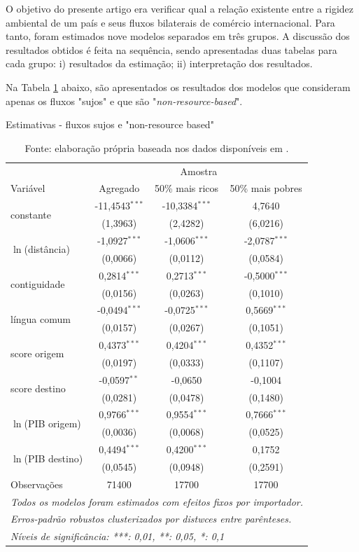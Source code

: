 \documentclass[12pt,
               openright,
               oneside,
               a4paper,
							 section=TITLE,     %
               subsection=Title,  %
               english,brazil]{article}
\begin{document}
O objetivo do presente artigo era verificar qual a relação existente entre a rigidez ambiental de um país e seus fluxos bilaterais de comércio internacional. Para tanto, foram estimados nove modelos separados em três grupos. A discussão dos resultados obtidos é feita na sequência, sendo apresentadas duas tabelas para cada grupo: i) resultados da estimação; ii) interpretação dos resultados. 

Na Tabela \ref{tab:resultados_nrb} abaixo, são apresentados os resultados dos modelos que consideram apenas os fluxos "sujos"  e que são "\textit{non-resource-based}".
\begin{table}[H]
\centering
\caption{Estimativas - fluxos sujos e "non-resource based"}
\label{tab:resultados_nrb}
\begin{tabular}{lccc}
 & \multicolumn{3}{c}{Amostra} \\ \cmidrule(l){2-4} 
Variável & Agregado & 50\% mais ricos & 50\% mais pobres \\ \midrule
\multirow{2}{*}{constante} & -11,4543$^{***}$ & -10,3384$^{***}$ & 4,7640 \\
 & (1,3963) & (2,4282) & (6,0216) \\
\multirow{2}{*}{$\ln$(distância)} & -1,0927$^{***}$ & -1,0606$^{***}$ & -2,0787$^{***}$ \\
 & (0,0066) & (0,0112) & (0,0584) \\
\multirow{2}{*}{contiguidade} & 0,2814$^{***}$ & 0,2713$^{***}$ & -0,5000$^{***}$ \\
 & (0,0156) & (0,0263) & (0,1010) \\
\multirow{2}{*}{língua comum} & -0,0494$^{***}$ & -0,0725$^{***}$ & 0,5669$^{***}$ \\
 & (0,0157) & (0,0267) & (0,1051) \\
\multirow{2}{*}{score origem} & 0,4373$^{***}$ & 0,4204$^{***}$ & 0,4352$^{***}$ \\
 & (0,0197) & (0,0333) & (0,1107) \\
\multirow{2}{*}{score destino} & -0,0597$^{**}$ & -0,0650 & -0,1004 \\
 & (0,0281) & (0,0478) & (0,1480) \\
\multirow{2}{*}{$\ln$(PIB origem)} & 0,9766$^{***}$ & 0,9554$^{***}$ & 0,7666$^{***}$ \\
 & (0,0036) & (0,0068) & (0,0525) \\
\multirow{2}{*}{$\ln$(PIB destino)} & 0,4494$^{***}$ & 0,4200$^{***}$ & 0,1752 \\
 & (0,0545) & (0,0948) & (0,2591) \\ \midrule
Observações& 71400&17700&17700\\
\bottomrule\bottomrule
\multicolumn{4}{l}{\emph{Todos os modelos foram estimados com efeitos fixos por importador.}}\\
\multicolumn{4}{l}{\emph{Erros-padrão robustos clusterizados por distwces entre parênteses.}}\\
\multicolumn{4}{l}{\emph{Níveis de significância: ***: 0,01, **: 0,05, *: 0,1}}\\
\end{tabular}
\caption*{\RaggedRight  Fonte: elaboração própria baseada nos dados disponíveis em \cite{Cepii2019, Comtrade2019, WorldBank2019}.} 
\end{table}
\end{document}
